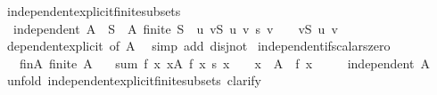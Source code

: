 \begin{isabellebody}
\endisatagproof
{\isafoldproof}%
%
\isadelimproof
\isanewline
%
\endisadelimproof
\isanewline
{}\isamarkupfalse%
\ independent{\isacharunderscore}{\kern0pt}explicit{\isacharunderscore}{\kern0pt}finite{\isacharunderscore}{\kern0pt}subsets{\isacharcolon}{\kern0pt}\isanewline
\ \ {\isachardoublequoteopen}independent\ A\ {\isasymlongleftrightarrow}\ {\isacharparenleft}{\kern0pt}{\isasymforall}S\ {\isasymsubseteq}\ A{\isachardot}{\kern0pt}\ finite\ S\ {\isasymlongrightarrow}\ {\isacharparenleft}{\kern0pt}{\isasymforall}u{\isachardot}{\kern0pt}\ {\isacharparenleft}{\kern0pt}{\isasymSum}v{\isasymin}S{\isachardot}{\kern0pt}\ u\ v\ {\isacharasterisk}{\kern0pt}s\ v{\isacharparenright}{\kern0pt}\ {\isacharequal}{\kern0pt}\ {}\ {\isasymlongrightarrow}\ {\isacharparenleft}{\kern0pt}{\isasymforall}v{\isasymin}S{\isachardot}{\kern0pt}\ u\ v\ {\isacharequal}{\kern0pt}\ {}{\isacharparenright}{\kern0pt}{\isacharparenright}{\kern0pt}{\isacharparenright}{\kern0pt}{\isachardoublequoteclose}\isanewline
%
\isadelimproof
\ \ %
\endisadelimproof
%
\isatagproof
{}\isamarkupfalse%
\ dependent{\isacharunderscore}{\kern0pt}explicit\ {\isacharbrackleft}{\kern0pt}of\ A{\isacharbrackright}{\kern0pt}\ \isamarkupfalse%
\ {\isacharparenleft}{\kern0pt}simp\ add{\isacharcolon}{\kern0pt}\ disj{\isacharunderscore}{\kern0pt}not{}{\isacharparenright}{\kern0pt}%
\endisatagproof
{\isafoldproof}%
%
\isadelimproof
\isanewline
%
\endisadelimproof
\isanewline
{}\isamarkupfalse%
\ independent{\isacharunderscore}{\kern0pt}if{\isacharunderscore}{\kern0pt}scalars{\isacharunderscore}{\kern0pt}zero{\isacharcolon}{\kern0pt}\isanewline
\ \ \ fin{\isacharunderscore}{\kern0pt}A{\isacharcolon}{\kern0pt}\ {\isachardoublequoteopen}finite\ A{\isachardoublequoteclose}\isanewline
\ \ \ sum{\isacharcolon}{\kern0pt}\ {\isachardoublequoteopen}{\isasymAnd}f\ x{\isachardot}{\kern0pt}\ {\isacharparenleft}{\kern0pt}{\isasymSum}x{\isasymin}A{\isachardot}{\kern0pt}\ f\ x\ {\isacharasterisk}{\kern0pt}s\ x{\isacharparenright}{\kern0pt}\ {\isacharequal}{\kern0pt}\ {}\ {\isasymLongrightarrow}\ x\ {\isasymin}\ A\ {\isasymLongrightarrow}\ f\ x\ {\isacharequal}{\kern0pt}\ {}{\isachardoublequoteclose}\isanewline
\ \ \ {\isachardoublequoteopen}independent\ A{\isachardoublequoteclose}\isanewline
%
\isadelimproof
%
\endisadelimproof
%
\isatagproof
{}\isamarkupfalse%
\ {\isacharparenleft}{\kern0pt}unfold\ independent{\isacharunderscore}{\kern0pt}explicit{\isacharunderscore}{\kern0pt}finite{\isacharunderscore}{\kern0pt}subsets{\isacharcomma}{\kern0pt}\ clarify{\isacharparenright}{\kern0pt}\isanewline

\end{isabellebody}
